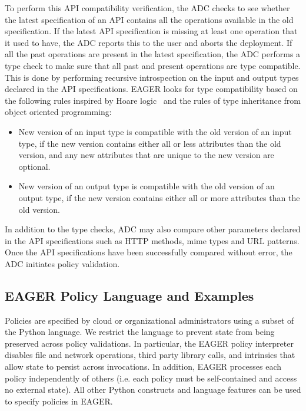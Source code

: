 To perform this API compatibility verification, the ADC checks to see whether
the latest specification of an API contains all the operations available in
the old specification. If the latest API specification is missing at least one
operation that it used to have, the ADC reports this to the user and aborts
the deployment. If all the past operations are present in the latest
specification, the ADC performs a type check to make sure that all past and
present operations are type compatible. This is done by performing recursive
introspection on the input and output types declared in the API
specifications. EAGER looks for type compatibility based on the following
rules inspired by Hoare logic~\cite{Hoare:1969:ABC:363235.363259} and the
rules of type inheritance from object oriented programming:
\begin{itemize}
\vspace{0.1in}
\item New version of an input type is compatible with the old version of an input type, if the new version contains either all or less attributes than the 
old version, and any new attributes that are unique to the new version are optional.
\vspace{0.1in}
\item New version of an output type is compatible with the old version of an output type, if the new version contains either all or more attributes than the 
old version.
\vspace{0.1in}
\end{itemize}
In addition to the type checks, ADC may also compare other parameters declared in the API specifications
such as HTTP methods, mime types and URL patterns.
Once the API specifications have been successfully compared without error,
the ADC initiates policy validation. 

\subsection{EAGER Policy Language and Examples}
Policies are specified by cloud
or organizational administrators using a subset of the Python language.  
We restrict the language to prevent state from being preserved across
policy validations. In particular, the EAGER policy interpreter disables 
file and network operations, third party library calls, 
and intrinsics that allow
state to persist across invocations.  
In addition, EAGER processes each 
policy independently of others (i.e. each policy must be self-contained and 
access no external state).  All other Python constructs and 
language features can be used to specify policies in EAGER.


